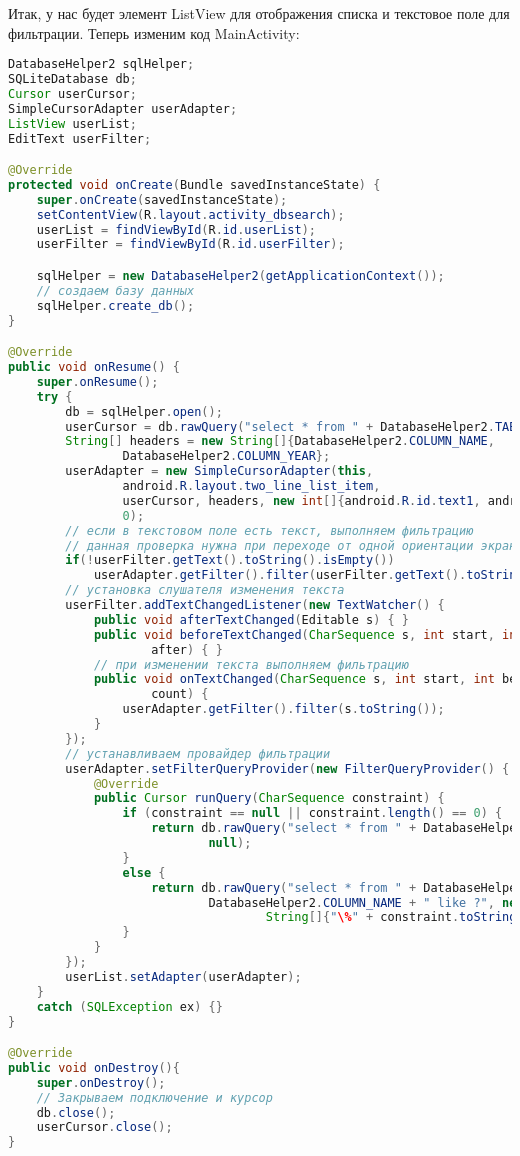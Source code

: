 Итак, у нас будет элемент ListView для отображения списка и текстовое поле
для фильтрации.
Теперь изменим код MainActivity:

\begin{lstlisting}[language=Java
	, label=lst:
	]
DatabaseHelper2 sqlHelper;
SQLiteDatabase db;
Cursor userCursor;
SimpleCursorAdapter userAdapter;
ListView userList;
EditText userFilter;

@Override
protected void onCreate(Bundle savedInstanceState) {
	super.onCreate(savedInstanceState);
	setContentView(R.layout.activity_dbsearch);
	userList = findViewById(R.id.userList);
	userFilter = findViewById(R.id.userFilter);

	sqlHelper = new DatabaseHelper2(getApplicationContext());
	// создаем базу данных
	sqlHelper.create_db();
}

@Override
public void onResume() {
	super.onResume();
	try {
		db = sqlHelper.open();
		userCursor = db.rawQuery("select * from " + DatabaseHelper2.TABLE,null);
		String[] headers = new String[]{DatabaseHelper2.COLUMN_NAME,
				DatabaseHelper2.COLUMN_YEAR};
		userAdapter = new SimpleCursorAdapter(this,
				android.R.layout.two_line_list_item,
				userCursor, headers, new int[]{android.R.id.text1, android.R.id.text2},
				0);
		// если в текстовом поле есть текст, выполняем фильтрацию
		// данная проверка нужна при переходе от одной ориентации экрана к другой
		if(!userFilter.getText().toString().isEmpty())
			userAdapter.getFilter().filter(userFilter.getText().toString());
		// установка слушателя изменения текста
		userFilter.addTextChangedListener(new TextWatcher() {
			public void afterTextChanged(Editable s) { }
			public void beforeTextChanged(CharSequence s, int start, int count, int
					after) { }
			// при изменении текста выполняем фильтрацию
			public void onTextChanged(CharSequence s, int start, int before, int
					count) {
				userAdapter.getFilter().filter(s.toString());
			}
		});
		// устанавливаем провайдер фильтрации
		userAdapter.setFilterQueryProvider(new FilterQueryProvider() {
			@Override
			public Cursor runQuery(CharSequence constraint) {
				if (constraint == null || constraint.length() == 0) {
					return db.rawQuery("select * from " + DatabaseHelper2.TABLE,
							null);
				}
				else {
					return db.rawQuery("select * from " + DatabaseHelper2.TABLE + " where " +
							DatabaseHelper2.COLUMN_NAME + " like ?", new
									String[]{"\%" + constraint.toString() + "\%"});
				}
			}
		});
		userList.setAdapter(userAdapter);
	}
	catch (SQLException ex) {}
}

@Override
public void onDestroy(){
	super.onDestroy();
	// Закрываем подключение и курсор
	db.close();
	userCursor.close();
}
\end{lstlisting}

